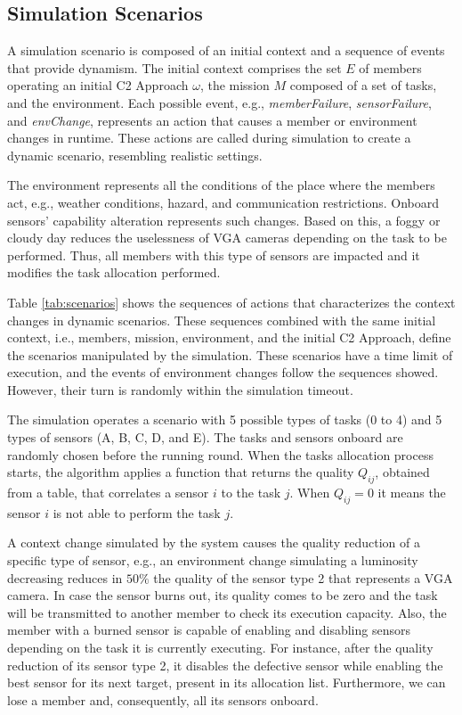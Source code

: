\subsection{Simulation Scenarios}
\label{sub:scenarios}

A simulation scenario is composed of an initial context and a sequence of events that provide dynamism. The initial context comprises the set $E$ of members operating an initial C2 Approach $\omega$, the mission $M$ composed of a set of tasks, and the environment. Each possible event, e.g., \textit{memberFailure}, \textit{sensorFailure}, and \textit{envChange}, represents an action that causes a member or environment changes in runtime. These actions are called during simulation to create a dynamic scenario, resembling realistic settings.

The environment represents all the conditions of the place where the members act, e.g., weather conditions, hazard, and communication restrictions. Onboard sensors' capability alteration represents such changes. Based on this, a foggy or cloudy day reduces the uselessness of VGA cameras depending on the task to be performed. Thus, all members with this type of sensors are impacted and it modifies the task allocation performed.

Table \ref{tab:scenarios} shows the sequences of actions that characterizes the context changes in dynamic scenarios. These sequences combined with the same initial context, i.e., members, mission, environment, and the initial C2 Approach,  define the scenarios manipulated by the simulation. These scenarios have a time limit of execution, and the events of environment changes follow the sequences showed. However, their turn is randomly within the simulation timeout.  



The simulation operates a scenario with 5 possible types of tasks (0 to 4) and 5 types of sensors (A, B, C, D, and E). The tasks and sensors onboard are randomly chosen before the running round. When the tasks allocation process starts, the algorithm applies a function that returns the quality $Q_{ij}$, obtained from a table, that correlates a sensor $i$ to the task $j$. When $Q_{ij}=0$ it means the sensor $i$ is not able to perform the task $j$.

A context change simulated by the system causes the quality reduction of a specific type of sensor, e.g., an environment change simulating a luminosity decreasing reduces in $50\%$ the quality of the sensor type 2 that represents a VGA camera. In case the sensor burns out, its quality comes to be zero and the task will be transmitted to another member to check its execution capacity. Also, the member with a burned sensor is capable of enabling and disabling sensors depending on the task it is currently executing. For instance, after the quality reduction of its sensor type 2, it disables the defective sensor while enabling the best sensor for its next target, present in its allocation list. Furthermore, we can lose a member and, consequently, all its sensors onboard.


